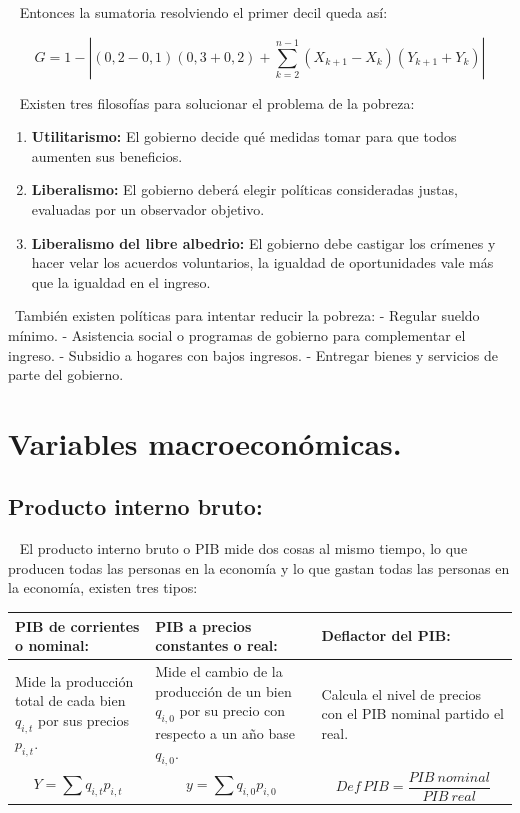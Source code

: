 \documentclass[
  letterpaper,
  DIV=11,
  numbers=noendperiod]{scrreport}
\providecommand{\tightlist}{%
  \setlength{\itemsep}{0pt}\setlength{\parskip}{0pt}}\usepackage{longtable,booktabs,array}
\begin{document}
~ Entonces la sumatoria resolviendo el primer decil queda así:

\[
G=1-\left|\left(0,2-0,1\right)\left(0,3+0,2\right)+\sum_{k=2}^{n-1}\left(X_{k+1}-X_k\right)\left(Y_{k+1}+Y_k\right)\right|
\]

~ Existen tres filosofías para solucionar el problema de la pobreza:

\begin{enumerate}
\def\labelenumi{\arabic{enumi})}
\tightlist
\item
  \textbf{Utilitarismo:} El gobierno decide qué medidas tomar para que
  todos aumenten sus beneficios.
\item
  \textbf{Liberalismo:} El gobierno deberá elegir políticas consideradas
  justas, evaluadas por un observador objetivo.
\item
  \textbf{Liberalismo del libre albedrio:} El gobierno debe castigar los
  crímenes y hacer velar los acuerdos voluntarios, la igualdad de
  oportunidades vale más que la igualdad en el ingreso.
\end{enumerate}

~También existen políticas para intentar reducir la pobreza: - Regular
sueldo mínimo. - Asistencia social o programas de gobierno para
complementar el ingreso. - Subsidio a hogares con bajos ingresos. -
Entregar bienes y servicios de parte del gobierno.


\hypertarget{variables-macroeconuxf3micas.}{%
\chapter{Variables
macroeconómicas.}\label{variables-macroeconuxf3micas.}}

\hypertarget{producto-interno-bruto}{%
\section{Producto interno bruto:}\label{producto-interno-bruto}}

~ El producto interno bruto o PIB mide dos cosas al mismo tiempo, lo que
producen todas las personas en la economía y lo que gastan todas las
personas en la economía, existen tres tipos:

\begin{table}[h]
    \centering
    \begin{tabular}{|p{40mm}|p{40mm}|p{50mm}|}
        \hline
        PIB de corrientes o nominal: & PIB a precios constantes o real: & Deflactor del PIB: \\ \hline
        Mide la producción total de cada bien $q_{i,t}$ por sus precios $p_{i,t}$. & Mide el cambio de la producción de un bien $q_{i,0}$ por su precio con respecto a un año base $q_{i,0}$.  & Calcula el nivel de precios con el PIB nominal partido el real. \\ \hline
        \[Y=\sum{q_{i,t}p_{i,t}}\] & \[y=\sum{q_{i,0}p_{i,0}}\] & \[Def \, PIB =\frac{PIB\ nominal}{PIB\ real}\] \\ \hline
    \end{tabular}
    
\end{table}
\end{document}
